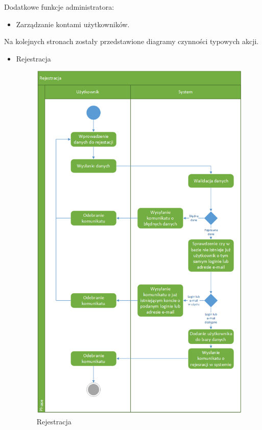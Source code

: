 Dodatkowe funkcje administratora:
\begin{itemize}
	\item Zarządzanie kontami użytkowników.
\end{itemize}

Na kolejnych stronach zostały przedstawione diagramy czynności typowych akcji.

\begin{itemize}
	\item Rejestracja 
	\begin{figure}[h]
	\centering
	\includegraphics[scale=0.7]{Rejestracja}
	\caption{\label{fig:activity_01}Rejestracja}
	\end{figure}

\end{itemize}
